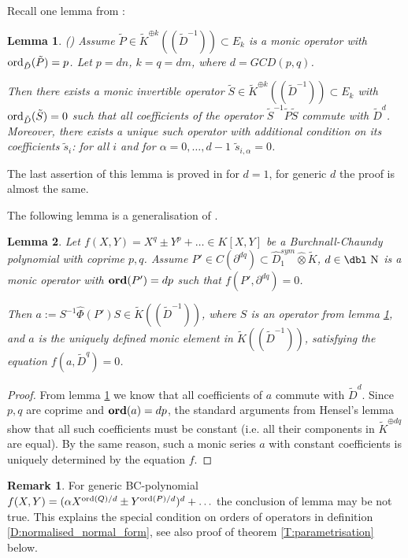 \documentclass[11pt]{article}
\theoremstyle{definition}
\newcommand{\dn}{{\mbox{\dbl N}}}
\newcommand{\ord}{\mathop{\rm ord}\nolimits}
\newtheorem{rem}{Remark}[section]
\theoremstyle{plain}
\newtheorem{lemma}{Lemma}[section]
\numberwithin{equation}{section}
\newcommand{\Ord}{\mathop {\rm \bf ord}}
\begin{document}
Recall one lemma from \cite{GZ24}:
\begin{lemma}{(\cite[Lem. 3.3]{GZ24})}
\label{L:conjugation in E_q}
Assume $\tilde{P}\in \tilde{K}^{\oplus k}((\tilde{D}^{-1}))\subset E_k$ is a monic operator with $\ord_{\tilde{D}}(\tilde{P})=p$. Let $p=dn$, $k=q=dm$, where $d=GCD (p,q)$. 

Then there exists a monic invertible operator $\tilde{S}\in \tilde{K}^{\oplus k}((\tilde{D}^{-1}))\subset E_k$ with $\ord_{\tilde{D}}(\tilde{S})=0$ such that all coefficients of the operator $\tilde{S}^{-1}\tilde{P}\tilde{S}$ commute with $\tilde{D}^d$. Moreover, there exists a unique such operator with additional condition on its coefficients $\tilde{s}_i$: for all $i$ and for $\alpha =0, \ldots , d-1$ $\tilde{s}_{i,\alpha}=0$. 
\end{lemma}

The last assertion of this lemma is proved in \cite[Th. 5.2]{Zheglov25} for $d=1$, for generic $d$ the proof is almost the same. 

The following lemma is a generalisation of \cite[Lem. 3.5]{GZ24}.
\begin{lemma}
\label{L:solution_of_BC_equation}
Let $f(X,Y) =  X^q\pm Y^p+\ldots \in K[X,Y]$ be a Burchnall-Chaundy polynomial with coprime $p,q$. Assume  $P'\in C(\partial^{dq})\subset \hat{D}_1^{sym}\hat{\otimes}\tilde{K}$, $d\in \dn$ is a monic operator with $\Ord (P')=dp$ such that $f(P',\partial^{dq})=0$. 

Then $a:= S^{-1}\hat{\Phi}(P')S\in \tilde{K}((\tilde{D}^{-1}))$, where $S$ is an operator from lemma \ref{L:conjugation in E_q}, and $a$ is the uniquely defined monic element in $\tilde{K}((\tilde{D}^{-1}))$, satisfying the equation $f(a,\tilde{D}^q)=0$. 
\end{lemma}

\begin{proof}
From lemma \ref{L:conjugation in E_q} we know that all coefficients of $a$ commute with $\tilde{D}^d$. Since $p,q$ are coprime and $\Ord (a)=dp$, the standard arguments from Hensel's lemma show that all such coefficients must be constant (i.e. all their components in $\tilde{K}^{\oplus dq}$ are equal). By the same reason, such a monic series $a$ with constant coefficients is uniquely determined by the equation $f$. 
\end{proof}

\begin{rem}
\label{R:solution_of_BC_equation}
For generic BC-polynomial $f(X,Y) = (\alpha X^{\ord (Q)/d}\pm Y^{\ord (P)/d})^d+\ldots $ the conclusion of lemma may be not true. This explains the special condition on orders of operators in definition \ref{D:normalised_normal_form}, see also proof of theorem \ref{T:parametrisation} below.
\end{rem}
\end{document}

